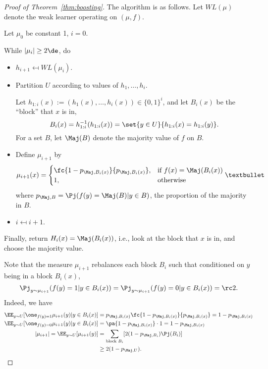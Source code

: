 \begin{proof}[Proof of Theorem~\ref{thm:boosting}]

The algorithm is as follows. Let $WL(\mu)$ denote the weak learner operating on $(\mu, f)$.

Let $\mu_0$ be constant 1, $i=0$.

While $|\mu_i|\ge 2\de$, do
\begin{itemize}
\item
$h_{i+1}\mapsfrom WL(\mu_i)$.
\item
Partition $U$ according to values of $h_1,\ldots,h_i$.

Let $h_{1:i}(x):= (h_1(x),\ldots, h_i(x))\in \{0,1\}^i$, and let $B_i(x)$ be the ``block'' that $x$ is in, 
$$B_i(x) = h_{1:i}^{-1}(h_{1:i}(x)) = \set{y\in U}{h_{1:i}(x)=h_{1:i}(y)}.$$ 
For a set $B$, let $\Maj(B)$ denote the majority value of $f$ on $B$. 
\item
Define $\mu_{i+1}$ by 
%
$$\mu_{i+1}(x) = \begin{cases}
\fc{1-p_{\Maj, B_i(x)}}{p_{\Maj, B_i(x)}},&\text{if } f(x)=\Maj(B_i(x))\\
1,&\text{otherwise}
\end{cases}• $$
where $p_{\Maj,B} = \Pj(f(y) = \Maj(B)| y\in B)$, the proportion of the majority in $B$.
\item
$i\mapsfrom i+1$.
\end{itemize}
Finally, return $H_{i}(x) = \Maj({B_{i}(x)})$, i.e., look at the block that $x$ is in, and choose the majority value.

Note that the measure $\mu_{i+1}$ rebalances %
each block $B_i$ such that conditioned on $y$ being in a block $B_i(x)$, 
$$\Pj_{y\sim \mu_{i+1}}(f(y)=1|y\in B_i(x)) = \Pj_{y \sim \mu_{i+1}}(f(y)=0|y\in B_i(x))=\rc 2.$$
Indeed, we have
\begin{align}
\EE_{y\sim U}[\one_{f(y)=1} 
 \mu_{i+1}(y) |y\in B_i(x)]
 &=p_{\Maj, B_i(x)} \fc{1-p_{\Maj, B_i(x)}}{p_{\Maj, B_i(x)}} = 1-p_{\Maj, B_i(x)}\\
 \EE_{y\sim U}[\one_{f(y)=0} 
 \mu_{i+1}(y) |y\in B_i(x)]
 &=\pa{1-p_{\Maj, B_i(x)}}\cdot 1 = 1-p_{\Maj, B_i(x)}\\
|\mu_{i+1}| =  \EE_{y\sim U}[
 \mu_{i+1}(y)]&=\sum_{\text{block }B_i} [2(1-p_{\Maj, B_i}) \Pj(B_i)]\\
 & \ge 2(1-p_{\Maj,U}).
\end{align}


\end{proof}
